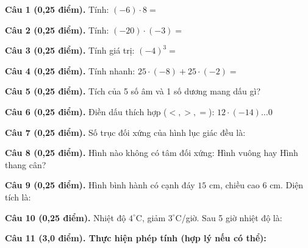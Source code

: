 \documentclass[12pt,a4paper]{article}
\begin{document}
\vspace{1.0mm}
\noindent\textbf{Câu 1 (0,25 điểm).} Tính: $(-6) \cdot 8 =$ \par\vspace{0.25mm}
\noindent\textbf{Câu 2 (0,25 điểm).} Tính: $(-20) \cdot (-3) =$ \par\vspace{0.25mm}
\noindent\textbf{Câu 3 (0,25 điểm).} Tính giá trị: $(-4)^3 =$ \par\vspace{0.25mm}
\noindent\textbf{Câu 4 (0,25 điểm).} Tính nhanh: $25 \cdot (-8) + 25 \cdot (-2) =$ \par\vspace{0.25mm}
\noindent\textbf{Câu 5 (0,25 điểm).} Tích của 5 số âm và 1 số dương mang dấu gì? \par\vspace{0.25mm}
\noindent\textbf{Câu 6 (0,25 điểm).} Điền dấu thích hợp ($<, >, =$): $12 \cdot (-14) \dots 0$ \shortans{<}\par\vspace{0.25mm}
\noindent\textbf{Câu 7 (0,25 điểm).} Số trục đối xứng của hình lục giác đều là: \par\vspace{0.25mm}
\noindent\textbf{Câu 8 (0,25 điểm).} Hình nào không có tâm đối xứng: Hình vuông hay Hình thang cân? \par\vspace{0.25mm}
\noindent\textbf{Câu 9 (0,25 điểm).} Hình bình hành có cạnh đáy $15\text{ cm}$, chiều cao $6\text{ cm}$. Diện tích là: \par\vspace{0.25mm}
\noindent\textbf{Câu 10 (0,25 điểm).} Nhiệt độ $4^\circ\text{C}$, giảm $3^\circ\text{C}$/giờ. Sau 5 giờ nhiệt độ là: \par\vspace{0.25mm}

\vspace{0.3mm}
\noindent\textbf{Câu 11 (3,0 điểm). Thực hiện phép tính (hợp lý nếu có thể):}
\vspace{0.4mm}
\end{document}
